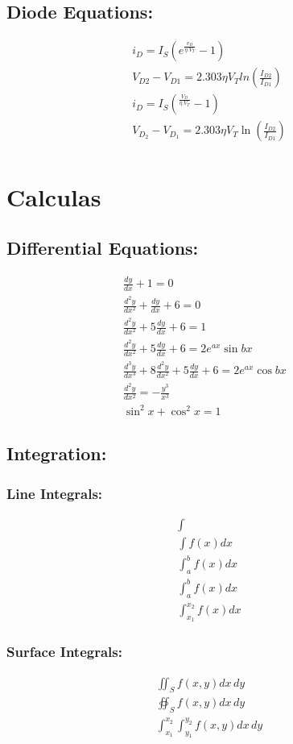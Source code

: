 \documentclass[12 pt,a4paper]{report}
\begin{document}
\section{Diode Equations:}
\begin{eqnarray}
i_D=I_S(e^{\frac{v_D}{\eta.V_T}}-1)\\
V_{D2}-V_{D1}=2.303\eta V_{T}ln(\frac{I_{D2}}{I_{D1}})\\
i_D=I_S\left(^{\frac{V_D}{\eta.V_T}}-1\right)\\
V_{D_{2}}-V_{D_{1}}=2.303\eta V_{T}\ln(\frac{I_{D2}}{I_{D1}})\\
\end{eqnarray}
\chapter{Calculas}
\section{Differential Equations:}
\begin{eqnarray}
\frac{dy}{dx}+1=0&\\
\frac{d^{2}y}{dx^{2}}+\frac{dy}{dx}+6=0&\\
\frac{d^{2}y}{dx^{2}}+5\frac{dy}{dx}+6=1&\\
\frac{d^{2}y}{dx^{2}}+5\frac{dy}{dx}+6=2e^{ax}\sin{bx}&\\
\frac{d^{3}y}{dx^{3}}+8\frac{d^{2}y}{dx^{2}}+5\frac{dy}{dx}+6=2e^{ax}\cos{bx}&\\
\frac{d^{2}y}{dx^{2}}=-\frac{y^{3}}{x^{3}}\\
\sin^{2}x+\cos^{2}x=1
\end{eqnarray}
\pagebreak
\section{Integration:}
\subsection{Line Integrals:}
\begin{eqnarray}
\int\\
\int f(x)dx\\
\int_{a}^{b} f(x)dx\\
\int_{a}^{b} f(x)dx\\
\int_{x_{1}}^{x_{2}} f(x)dx 
\end{eqnarray}
\subsection{Surface Integrals: }
\begin{eqnarray}
\iint_{S} f(x,y)dx\,dy\\
\oiint_{S} f(x,y)dx\,dy\\
\int_{x_{1}}^{x_{2}}\int_{y_{1}}^{y_{2}}f(x,y)dx\,dy
\end{eqnarray}
\end{document}
